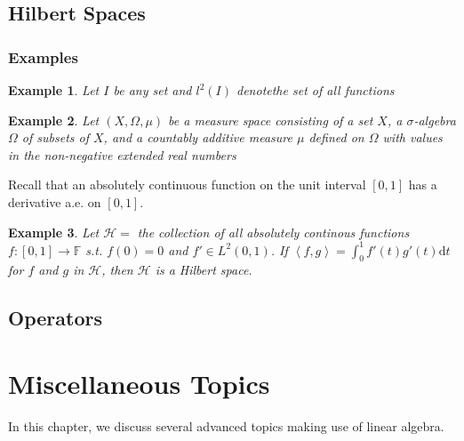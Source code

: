 \documentclass{book}
\newtheorem{example}{Example}[section]
\theoremstyle{definition}
\begin{document}
\section{Hilbert Spaces}
\subsection{Examples}
\begin{example}
    Let $I$ be any set and $l^2(I)$ denotethe set of all functions 
\end{example}

\begin{example}
    Let $(X,\Omega,\mu)$ be a measure space consisting of a set $X$, a $\sigma$-algebra $\Omega$ of subsets of $X$,
    and a countably additive measure $\mu$ defined on $\Omega$ with values in the non-negative extended real numbers
\end{example}

Recall that an absolutely continuous function on the unit interval $[0,1]$ has a derivative a.e. on $[0,1]$.
\begin{example}
    Let $\mathcal{H}=$ the collection of all absolutely continous functions $f:[0,1]\to \mathbb{F}$ s.t. $f(0)=0$
    and $f'\in L^2(0,1)$. If $\left\langle f,g\right\rangle=\int_0^1 f'(t)g'(t)\mathrm{d}t$ for $f$ and $g$ in $\mathcal{H}$,
    then $\mathcal{H}$ is a Hilbert space.
\end{example}

\section{Operators}












\chapter{Miscellaneous Topics}
In this chapter, we discuss several advanced topics making use of linear algebra.
\end{document}
